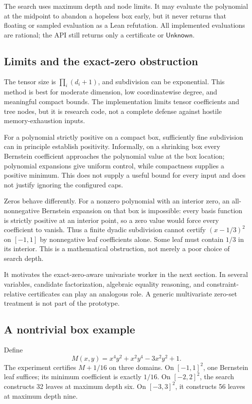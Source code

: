 \documentclass[11pt,a4paper]{article}
\theoremstyle{definition}
\newcommand{\unknown}{\ensuremath{\mathsf{Unknown}}}
\begin{document}
The search uses maximum depth and node limits. It may evaluate the polynomial at the midpoint to abandon a hopeless box early, but it never returns that floating or sampled evaluation as a Lean refutation. All implemented evaluations are rational; the API still returns only a certificate or \unknown{}.

\subsection{Limits and the exact-zero obstruction}

The tensor size is $\prod_i(d_i+1)$, and subdivision can be exponential. This method is best for moderate dimension, low coordinatewise degree, and meaningful compact bounds. The implementation limits tensor coefficients and tree nodes, but it is research code, not a complete defense against hostile memory-exhaustion inputs.

For a polynomial strictly positive on a compact box, sufficiently fine subdivision can in principle establish positivity. Informally, on a shrinking box every Bernstein coefficient approaches the polynomial value at the box location; polynomial expansions give uniform control, while compactness supplies a positive minimum. This does not supply a useful bound for every input and does not justify ignoring the configured caps.

Zeros behave differently. For a nonzero polynomial with an interior zero, an all-nonnegative Bernstein expansion on that box is impossible: every basis function is strictly positive at an interior point, so a zero value would force every coefficient to vanish. Thus a finite dyadic subdivision cannot certify $(x-1/3)^2$ on $[-1,1]$ by nonnegative leaf coefficients alone. Some leaf must contain $1/3$ in its interior. This is a mathematical obstruction, not merely a poor choice of search depth.

It motivates the exact-zero-aware univariate worker in the next section. In several variables, candidate factorization, algebraic equality reasoning, and constraint-relative certificates can play an analogous role. A generic multivariate zero-set treatment is not part of the prototype.

\subsection{A nontrivial box example}

Define
\[
 M(x,y)=x^4y^2+x^2y^4-3x^2y^2+1.
\]
The experiment certifies $M+1/16$ on three domains. On $[-1,1]^2$, one Bernstein leaf suffices; its minimum coefficient is exactly $1/16$. On $[-2,2]^2$, the search constructs 32 leaves at maximum depth six. On $[-3,3]^2$, it constructs 56 leaves at maximum depth nine.
\end{document}
